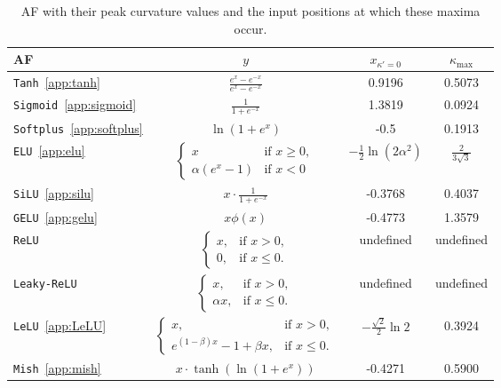 \documentclass[manuscript, screen, review]{jair}
\begin{document}
\begin{table}
  \caption{AF with their peak curvature values and the input positions at which these maxima occur.}
  \label{tab:AF}
  \begin{tabular}{@{}lccc@{}}
    \toprule
    AF & $y$ & $x_{\kappa' = 0}$ & $\kappa_{\text{max}}$\\
    \midrule
    \texttt{Tanh}~\ref{app:tanh} & $\frac{e^{x} - e^{-x}}{e^{x} - e^{-x}}$ & 0.9196 & 0.5073\\
    \texttt{Sigmoid}~\ref{app:sigmoid} & $\frac{1}{1 + e^{-x}}$ & 1.3819 & 0.0924\\
    \texttt{Softplus}~\ref{app:softplus} & $\ln{({1 + e^{x}})}$ & -0.5 & 0.1913\\
    \texttt{ELU}~\ref{app:elu} & $
    \begin{cases}
      x & \text{if } x \geq 0, \\
      \alpha (e^x - 1) & \text{if } x < 0
    \end{cases}$ & $-\frac{1}{2} \ln(2 \alpha^2)$ & $\frac{2}{3\sqrt3}$\\
    \texttt{SiLU}~\ref{app:silu} & $x \cdot \frac{1}{1 + e^{-x}}$ & -0.3768 & 0.4037 \\
    \texttt{GELU}~\ref{app:gelu} & $x \phi(x)$ & -0.4773 & 1.3579\\
    \texttt{ReLU} & $
    \begin{cases}
    x, & \text{if } x > 0, \\
    0, & \text{if } x \le 0.
    \end{cases}$ & undefined & undefined\\
    \texttt{Leaky-ReLU} & $
    \begin{cases}
    x, & \text{if } x > 0, \\
    \alpha x, & \text{if } x \le 0.
    \end{cases}$ & undefined & undefined\\
    \texttt{LeLU}~\ref{app:LeLU} & $
    \begin{cases}
    x, & \text{if } x > 0, \\
    e^{(1 - \beta)x} - 1 + \beta x, & \text{if } x \le 0.
    \end{cases}$ & $- \frac{\sqrt{2}}{2}\ln2$ & 0.3924\\
    \texttt{Mish}~\ref{app:mish} & $x \cdot \tanh\!\left(\ln(1 + e^{x})\right)$ & -0.4271 & 0.5900\\
  \bottomrule
\end{tabular}
\end{table}
\end{document}
